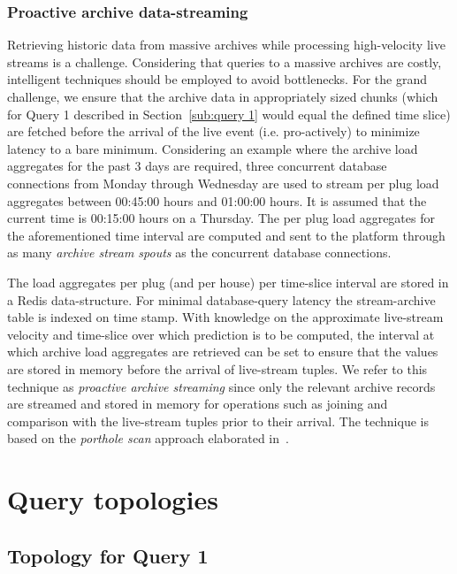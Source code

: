 \documentclass{sig-alternate}
\begin{document}
\subsubsection{Proactive archive data-streaming}
\label{sub:proarchstreams}
Retrieving historic data from massive archives while processing high-velocity live streams is a challenge. Considering that queries to a massive archives are costly, intelligent techniques should be employed to avoid bottlenecks. For the grand challenge, we ensure that the archive data in appropriately sized chunks (which for Query 1 described in Section~\ref{sub:query 1} would equal the defined time slice) are fetched before the arrival of the live event (i.e. pro-actively) to minimize latency to a bare minimum. Considering an example where the archive load aggregates for the past 3 days are required, three concurrent database connections from Monday through Wednesday are used to stream per plug load aggregates between  00:45:00 hours and 01:00:00 hours. It is assumed that the current time is 00:15:00 hours on a Thursday. The per plug load aggregates for the aforementioned time interval are computed and sent to the platform through as many  {\it archive stream spouts} as the concurrent database connections. 

The load aggregates per plug (and per house) per time-slice interval are stored in a Redis data-structure. For minimal database-query latency the stream-archive table is indexed on time stamp. With knowledge on the approximate live-stream velocity and time-slice over which prediction is to be computed, the interval at which archive load aggregates are retrieved can be set to ensure that the values are stored in memory before the arrival of live-stream tuples. We refer to this technique as {\it proactive archive streaming} since only the relevant archive records are streamed and stored in memory for operations such as joining and comparison with the live-stream tuples prior to their arrival. The technique is based on the {\it porthole scan}  approach elaborated in~\cite{tufte2007travel}.

\section{Query topologies}
 
\subsection{Topology for Query 1}
\label{sub:q1-topology}
\end{document}
